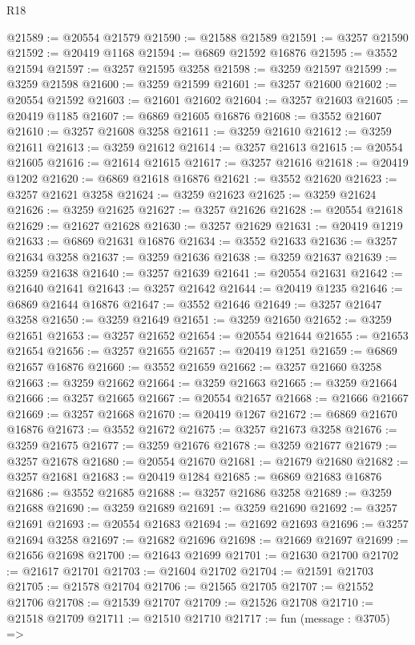 \begin{lexlean}{R18}
\begin{coremodule}
@21589 := @20554 @21579
@21590 := @21588 @21589
@21591 := @3257 @21590
@21592 := @20419 @1168
@21594 := @6869 @21592 @16876
@21595 := @3552 @21594
@21597 := @3257 @21595 @3258
@21598 := @3259 @21597
@21599 := @3259 @21598
@21600 := @3259 @21599
@21601 := @3257 @21600
@21602 := @20554 @21592
@21603 := @21601 @21602
@21604 := @3257 @21603
@21605 := @20419 @1185
@21607 := @6869 @21605 @16876
@21608 := @3552 @21607
@21610 := @3257 @21608 @3258
@21611 := @3259 @21610
@21612 := @3259 @21611
@21613 := @3259 @21612
@21614 := @3257 @21613
@21615 := @20554 @21605
@21616 := @21614 @21615
@21617 := @3257 @21616
@21618 := @20419 @1202
@21620 := @6869 @21618 @16876
@21621 := @3552 @21620
@21623 := @3257 @21621 @3258
@21624 := @3259 @21623
@21625 := @3259 @21624
@21626 := @3259 @21625
@21627 := @3257 @21626
@21628 := @20554 @21618
@21629 := @21627 @21628
@21630 := @3257 @21629
@21631 := @20419 @1219
@21633 := @6869 @21631 @16876
@21634 := @3552 @21633
@21636 := @3257 @21634 @3258
@21637 := @3259 @21636
@21638 := @3259 @21637
@21639 := @3259 @21638
@21640 := @3257 @21639
@21641 := @20554 @21631
@21642 := @21640 @21641
@21643 := @3257 @21642
@21644 := @20419 @1235
@21646 := @6869 @21644 @16876
@21647 := @3552 @21646
@21649 := @3257 @21647 @3258
@21650 := @3259 @21649
@21651 := @3259 @21650
@21652 := @3259 @21651
@21653 := @3257 @21652
@21654 := @20554 @21644
@21655 := @21653 @21654
@21656 := @3257 @21655
@21657 := @20419 @1251
@21659 := @6869 @21657 @16876
@21660 := @3552 @21659
@21662 := @3257 @21660 @3258
@21663 := @3259 @21662
@21664 := @3259 @21663
@21665 := @3259 @21664
@21666 := @3257 @21665
@21667 := @20554 @21657
@21668 := @21666 @21667
@21669 := @3257 @21668
@21670 := @20419 @1267
@21672 := @6869 @21670 @16876
@21673 := @3552 @21672
@21675 := @3257 @21673 @3258
@21676 := @3259 @21675
@21677 := @3259 @21676
@21678 := @3259 @21677
@21679 := @3257 @21678
@21680 := @20554 @21670
@21681 := @21679 @21680
@21682 := @3257 @21681
@21683 := @20419 @1284
@21685 := @6869 @21683 @16876
@21686 := @3552 @21685
@21688 := @3257 @21686 @3258
@21689 := @3259 @21688
@21690 := @3259 @21689
@21691 := @3259 @21690
@21692 := @3257 @21691
@21693 := @20554 @21683
@21694 := @21692 @21693
@21696 := @3257 @21694 @3258
@21697 := @21682 @21696
@21698 := @21669 @21697
@21699 := @21656 @21698
@21700 := @21643 @21699
@21701 := @21630 @21700
@21702 := @21617 @21701
@21703 := @21604 @21702
@21704 := @21591 @21703
@21705 := @21578 @21704
@21706 := @21565 @21705
@21707 := @21552 @21706
@21708 := @21539 @21707
@21709 := @21526 @21708
@21710 := @21518 @21709
@21711 := @21510 @21710
@21717 := fun (message : @3705) =>

\end{coremodule}
\end{lexlean}
